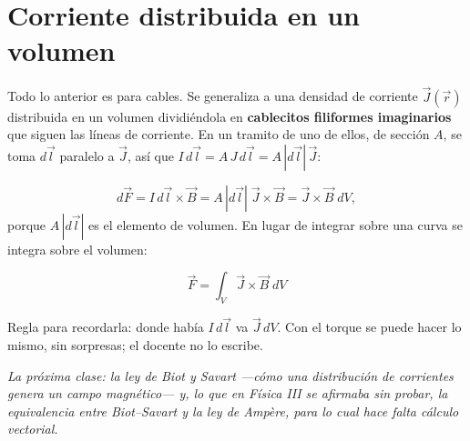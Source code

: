 \documentclass[12pt,a4paper]{article}
\begin{document}
\section{Corriente distribuida en un volumen}

Todo lo anterior es para cables. Se generaliza a una densidad de corriente
$\vec J(\vec r)$ distribuida en un volumen dividiéndola en \textbf{cablecitos
filiformes imaginarios} que siguen las líneas de corriente. En un tramito de
uno de ellos, de sección $A$, se toma $d\vec l$ paralelo a $\vec J$, así que
$I\,d\vec l = A\,J\,d\vec l = A\,|d\vec l|\,\vec J$:

\[
d\vec F = I\,d\vec l\times\vec B = A\,|d\vec l|\;\vec J\times\vec B
= \vec J\times\vec B\;dV,
\]
porque $A\,|d\vec l|$ es el elemento de volumen. En lugar de integrar sobre una
curva se integra sobre el volumen:

\begin{keybox}
\[
\boxed{\ \vec F = \int_V \vec J\times\vec B\;dV\ }
\]
\end{keybox}

Regla para recordarla: donde había $I\,d\vec l$ va $\vec J\,dV$. Con el torque
se puede hacer lo mismo, sin sorpresas; el docente no lo escribe.

\noindent\emph{La próxima clase: la ley de Biot y Savart ---cómo una distribución de corrientes
genera un campo magnético--- y, lo que en Física III se afirmaba sin probar, la
equivalencia entre Biot--Savart y la ley de Ampère, para lo cual hace falta
cálculo vectorial.}
\end{document}
